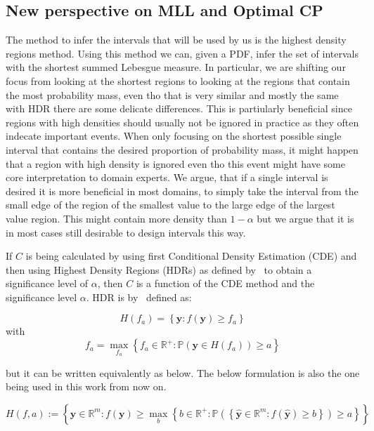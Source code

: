 \subsection{New perspective on MLL and Optimal CP}\label{sec:optimal_cp}

The method to infer the intervals that will be used by us is the highest density regions method. Using this method we can, given a PDF, infer the set of intervals with the shortest summed Lebesgue measure. In particular, we are shifting our focus from looking at the shortest regions to looking at the regions that contain the most probability mass, even tho that is very similar and mostly the same with HDR there are some delicate differences. This is partiularly beneficial since regions with high densities should usually not be ignored in practice as they often indecate important events. When only focusing on the shortest possible single interval that contains the desired proportion of probability mass, it might happen that a region with high density is ignored even tho this event might have some core interpretation to domain experts. We argue, that if a single interval is desired it is more beneficial in most domains, to simply take the interval from the small edge of the region of the smallest value to the large edge of the largest value region. This might contain more density than $1 - \alpha$ but we argue that it is in most cases still desirable to design intervals this way. %

If $C$ is being calculated by using first Conditional Density Estimation (CDE) and then using Highest Density Regions (HDRs) as defined by~\cite{hyndman1996computing} to obtain a significance level of $\alpha$, then $C$ is a function of the CDE method and the significance level $\alpha$. HDR is by~\cite{hyndman1996computing} defined as:

\[
    H\left(f_a\right)=\left\{\mathbf{y}: f(\mathbf{y}) \geq f_a\right\}
\]
with
\[
    f_a = \max_{f_a} \left\{f_a \in \mathbb{R^+}: \mathbb{P}\left(\mathbf{y}
    \in
    H(f_a)\right) \geq a \right\}
\]

but it can be written equivalently as below. The below formulation is also the one being used in this work from now on.

\begin{equation}
    H\left(f, a\right):=\left\{\mathbf{y} \in \mathbb{R}^m: f(\mathbf{y}) \geq
    \max_{b} \left\{b \in \mathbb{R^+}: \mathbb{P}\left(\left\{\mathbf{\hat{y}}
    \in
    \mathbb{R}^m: f(\mathbf{\hat{y}}) \geq b\right\}\right) \geq a
    \right\}\right\}
    \label{eq:HDR}
\end{equation}

